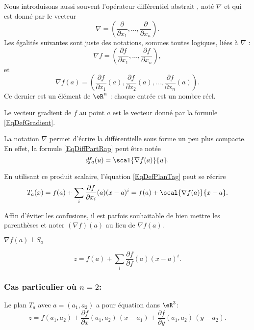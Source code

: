 Nous introduisons aussi souvent l'opérateur différentiel abstrait , noté $\nabla$ et qui est donné par le vecteur
\begin{equation}
    \nabla=\left( \frac{ \partial  }{ \partial x_1 },\ldots,\frac{ \partial  }{ \partial x_n } \right).
\end{equation}
Les égalités suivantes sont juste des notations, sommes toutes logiques, liées à $\nabla$ :
\begin{equation}
    \nabla f=\left( \frac{ \partial f }{ \partial x_1 },\ldots,\frac{ \partial f }{ \partial x_n } \right),
\end{equation}
et
\begin{equation}        \label{EqDefGradient}
    \nabla f(a) = \left(\frac{\partial f}{\partial x_1}(a), \frac{\partial f}{\partial x_2}(a), \ldots, \frac{\partial f}{\partial x_n}(a)\right).
\end{equation}
Ce dernier est un élément de $\eR^n$ : chaque entrée est un nombre réel.

\begin{definition} 
Le vecteur gradient de $f$ au point $a$ est le vecteur donné par la formule \eqref{EqDefGradient}.
\end{definition}
La notation $\nabla$ permet d'écrire la différentielle sous forme un peu plus compacte. En effet, la formule \eqref{EqDiffPartRap} peut être notée
\begin{equation}
    df_a(u)=\scal{\nabla f(a)}{u}.
\end{equation}

En utilisant ce produit scalaire, l'équation \eqref{EqDefPlanTag} peut se récrire
\begin{equation}
    T_a(x)=f(a)+\sum_i\frac{ \partial f }{ \partial x_i }(a)(x-a)^i=f(a)+\scal{\nabla f(a)}{x-a}.
\end{equation}

Affin d'éviter les confusions, il est parfois souhaitable de bien mettre les parenthèses et noter $(\nabla f)(a)$ au lieu de $\nabla f(a)$.

\begin{proposition}
$\nabla f(a)\,\bot \,S_a$
\end{proposition}


\begin{equation}        \label{EqPlanTgSansNabla}
    z=f(a)+\sum_i\frac{ \partial f }{ \partial f }(a)(x-a)^i.
\end{equation}

\subsubsection*{Cas particulier où $n=2$:} 
Le plan $T_a$ avec $a=(a_1,a_2)$ a pour équation dans $\eR^3$:
\begin{equation}        \label{EqPlanTgEnDimDeux}
    z = f(a_1,a_2) + \frac{\partial f}{\partial x}(a_1,a_2)\,(x-a_1)+ \frac{\partial f}{\partial y}(a_1,a_2)\,(y-a_2).
\end{equation}

